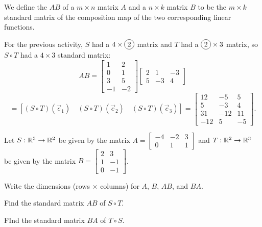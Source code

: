 \begin{applicationActivities}
\begin{definition}
We define the  \(AB\) of a \(m \times n\) matrix \(A\) and a
\(n \times k\)
matrix \(B\) to be the \(m \times k\) standard matrix of the composition map of the
two corresponding linear functions.

\vspace{1em}

For the previous activity, \(S\) had a \(4\times \circledNumber{2}\) matrix and
\(T\) had a \(\circledNumber{2}\times 3\) matrix, so \(S\circ T\) had a
\(4\times 3\) standard matrix:
\[
  AB
    =
  \begin{bmatrix} 1 & 2 \\ 0 & 1 \\ 3 & 5 \\ -1 & -2 \end{bmatrix}
  \begin{bmatrix} 2 & 1 & -3 \\ 5 & -3 & 4 \end{bmatrix}
\]
\[
    =
  \left[
  (S \circ T)(\vec{e}_1) \hspace{1em}
  (S\circ T)(\vec{e}_2) \hspace{1em}
  (S \circ T)(\vec{e}_3)
  \right]
    =
  \begin{bmatrix}
    12 & -5 & 5 \\
    5 & -3 & 4 \\
    31 & -12 & 11 \\
    -12 & 5 & -5
  \end{bmatrix}
.\]
\end{definition}



\begin{activity}{15}
Let \(S: \mathbb{R}^3 \rightarrow \mathbb{R}^2\) be given by the matrix 
\(A=\begin{bmatrix} -4 & -2 & 3 \\ 0 & 1 & 1 \end{bmatrix}\)
and \(T: \mathbb{R}^2 \rightarrow \mathbb{R}^3\) be given by the matrix
\(B=\begin{bmatrix} 2 & 3 \\ 1 & -1 \\ 0 & -1 \end{bmatrix}\).

\begin{subactivity}
Write the dimensions (rows \(\times\) columns)
for \(A\), \(B\), \(AB\), and \(BA\).
\end{subactivity}
\begin{subactivity}
Find the standard matrix \(AB\) of \(S \circ T\).
\end{subactivity}
\begin{subactivity}
FInd the standard matrix \(BA\) of \(T \circ S\).
\end{subactivity}
\end{activity}



\end{applicationActivities}
